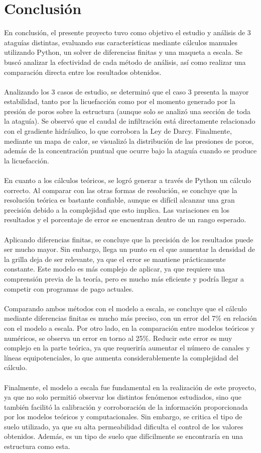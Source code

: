 \part{Conclusión}

En conclusión, el presente proyecto tuvo como objetivo el estudio y análisis de 3 ataguías distintas, evaluando sus características mediante cálculos manuales utilizando Python, un solver de diferencias finitas y una maqueta a escala. Se buscó analizar la efectividad de cada método de análisis, así como realizar una comparación directa entre los resultados obtenidos. 
\\ \\
Analizando los 3 casos de estudio, se determinó que el caso 3 presenta la mayor estabilidad, tanto por la licuefacción como por el momento generado por la presión de poros sobre la estructura (aunque solo se analizó una sección de toda la ataguía). Se observó que el caudal de infiltración está directamente relacionado con el gradiente hidráulico, lo que corrobora la Ley de Darcy. Finalmente, mediante un mapa de calor, se visualizó la distribución de las presiones de poros, además de la concentración puntual que ocurre bajo la ataguía cuando se produce la licuefacción.
\\ \\
En cuanto a los cálculos teóricos, se logró generar a través de Python un cálculo correcto. Al comparar con las otras formas de resolución, se concluye que la resolución teórica es bastante confiable, aunque es difícil alcanzar una gran precisión debido a la complejidad que esto implica. Las variaciones en los resultados y el porcentaje de error se encuentran dentro de un rango esperado.
\\ \\
Aplicando diferencias finitas, se concluye que la precisión de los resultados puede ser mucho mayor. Sin embargo, llega un punto en el que aumentar la densidad de la grilla deja de ser relevante, ya que el error se mantiene prácticamente constante. Este modelo es más complejo de aplicar, ya que requiere una comprensión previa de la teoría, pero es mucho más eficiente y podría llegar a competir con programas de pago actuales.
\\ \\
Comparando ambos métodos con el modelo a escala, se concluye que el cálculo mediante diferencias finitas es mucho más preciso, con un error del 7\% en relación con el modelo a escala. Por otro lado, en la comparación entre modelos teóricos y numéricos, se observa un error en torno al 25\%. Reducir este error es muy complejo en la parte teórica, ya que requeriría aumentar el número de canales y líneas equipotenciales, lo que aumenta considerablemente la complejidad del cálculo.
\\ \\
Finalmente, el modelo a escala fue fundamental en la realización de este proyecto, ya que no solo permitió observar los distintos fenómenos estudiados, sino que también facilitó la calibración y corroboración de la información proporcionada por los modelos teóricos y computacionales. Sin embargo, se critica el tipo de suelo utilizado, ya que su alta permeabilidad dificulta el control de los valores obtenidos. Además, es un tipo de suelo que difícilmente se encontraría en una estructura como esta.
